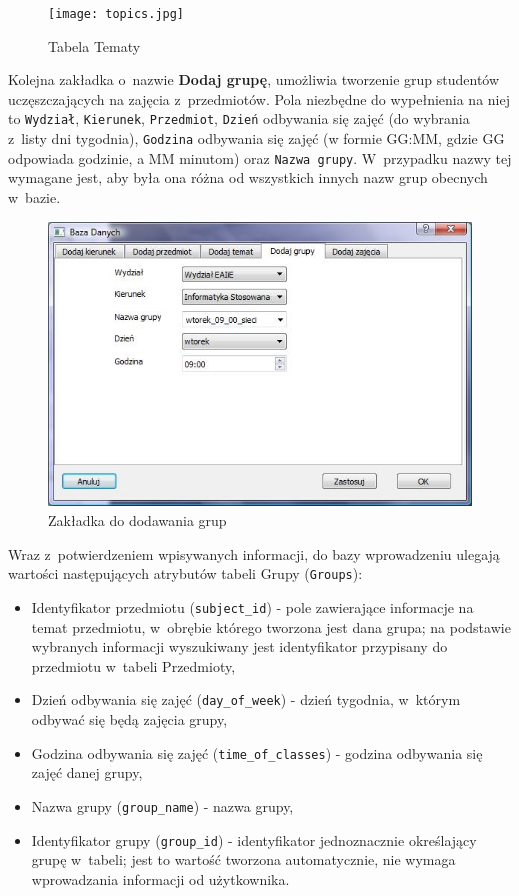 \begin{figure}
\begin{center}
\texttt{[image: topics.jpg]}
\caption{Tabela Tematy}
\label{fig:topics}
\end{center}
\end{figure}

Kolejna zakładka o~nazwie \textbf{Dodaj grupę}, umożliwia tworzenie grup studentów uczęszczających na zajęcia z~przedmiotów. Pola niezbędne do wypełnienia na niej to \verb!Wydział!, \verb!Kierunek!, \verb!Przedmiot!, \verb!Dzień! odbywania się zajęć (do wybrania z~listy dni tygodnia), \verb!Godzina! odbywania się zajęć (w formie GG:MM, gdzie GG odpowiada godzinie, a MM minutom) oraz \verb!Nazwa grupy!. W~przypadku nazwy tej wymagane jest, aby była ona różna od wszystkich innych nazw grup obecnych w~bazie.

\begin{figure}
\begin{center}
\includegraphics[scale=0.7]{dodaj_grupe.jpg}
\caption{Zakładka do dodawania grup}
\label{fig:dodajGrupe}
\end{center}
\end{figure}

 Wraz z~potwierdzeniem wpisywanych informacji, do bazy wprowadzeniu ulegają wartości następujących atrybutów tabeli Grupy (\verb!Groups!):
\begin{itemize}
\item Identyfikator przedmiotu (\verb!subject_id!) - pole zawierające informacje na temat przedmiotu, w~obrębie którego tworzona jest dana grupa; na podstawie wybranych informacji wyszukiwany jest identyfikator przypisany do przedmiotu w~tabeli Przedmioty,
\item Dzień odbywania się zajęć (\verb!day_of_week!) - dzień tygodnia, w~którym odbywać się będą zajęcia grupy,
\item Godzina odbywania się zajęć (\verb!time_of_classes!) - godzina odbywania się zajęć danej grupy,
\item Nazwa grupy (\verb!group_name!) - nazwa grupy,
\item Identyfikator grupy (\verb!group_id!) - identyfikator jednoznacznie określający grupę w~tabeli; jest to wartość tworzona automatycznie, nie wymaga wprowadzania informacji od użytkownika.
\end{itemize}

